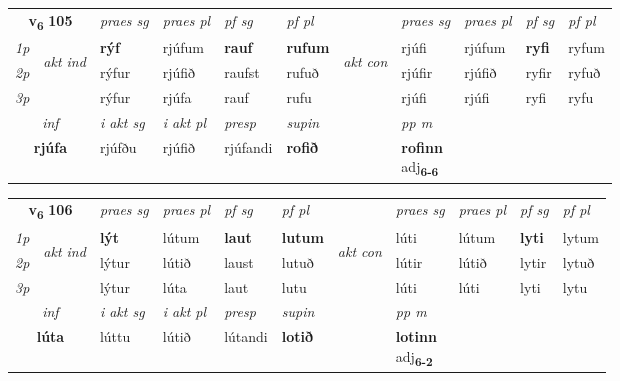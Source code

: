 \noindent
\begin{tabular}{lllllllllll} \toprule
\multicolumn{2}{c}{\textbf{v{\textsubscript{6}}} \Large{\textbf{105}}}  &  \textit{praes sg}  & \textit{praes pl}  &\textit{ pf sg} & \textit{pf pl} &  &  \textit{praes sg}  & \textit{praes pl}  & \textit{pf sg} & \textit{pf pl } \\*
	\cmidrule{3-6} \cmidrule{8-11}
 {\textit{1p}} & \multirow{3}{*}{\begin{turn}{90}\textit{akt ind}\end{turn}} & \textbf{rýf} & rjúfum & \textbf{rauf} & \textbf{rufum} & \multirow{3}{*}{\begin{turn}{90}\textit{akt con}\end{turn}} &rjúfi & rjúfum & \textbf{ryfi} & ryfum\\*
 {\textit{2p}} &  &  rýfur  & rjúfið & raufst & rufuð & & rjúfir & rjúfið & ryfir & ryfuð \\*
{\textit{3p}} &  & rýfur & rjúfa & rauf & rufu & & rjúfi & rjúfi& ryfi & ryfu \\*
\cmidrule{3-6} \cmidrule{8-11}

   \multicolumn{2}{c}{\textit{inf}}  & \textit{i akt sg} & \textit{i akt pl}   & \textit{presp} & \textit{supin}  && \textit{pp m} \\*
  \multicolumn{2}{c}{\textbf{rjúfa}} & rjúfðu  & rjúfið   & rjúfandi &  \textbf{rofið}  && \specialcell{\textbf{rofinn} \\ adj\textbf{\textsubscript{6-6}}} \\*
\end{tabular}

\noindent
\begin{tabular}{lllllllllll} \toprule
\multicolumn{2}{c}{\textbf{v{\textsubscript{6}}} \Large{\textbf{106}}}  &  \textit{praes sg}  & \textit{praes pl}  &\textit{ pf sg} & \textit{pf pl} &  &  \textit{praes sg}  & \textit{praes pl}  & \textit{pf sg} & \textit{pf pl } \\*
	\cmidrule{3-6} \cmidrule{8-11}
 {\textit{1p}} & \multirow{3}{*}{\begin{turn}{90}\textit{akt ind}\end{turn}} & \textbf{lýt} & lútum & \textbf{laut} & \textbf{lutum} & \multirow{3}{*}{\begin{turn}{90}\textit{akt con}\end{turn}} &lúti & lútum & \textbf{lyti} & lytum\\*
 {\textit{2p}} &  &  lýtur  & lútið & laust & lutuð & & lútir & lútið & lytir & lytuð \\*
{\textit{3p}} &  & lýtur & lúta & laut & lutu & & lúti & lúti& lyti & lytu \\*
\cmidrule{3-6} \cmidrule{8-11}

   \multicolumn{2}{c}{\textit{inf}}  & \textit{i akt sg} & \textit{i akt pl}   & \textit{presp} & \textit{supin}  && \textit{pp m} \\*
  \multicolumn{2}{c}{\textbf{lúta}} & lúttu  & lútið   & lútandi &  \textbf{lotið}  && \specialcell{\textbf{lotinn} \\ adj\textbf{\textsubscript{6-2}}} \\*
\end{tabular}

